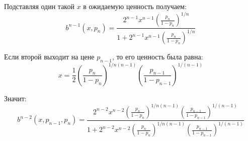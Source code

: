 \begin{enumerate}
Подставляя один такой $ x $ в ожидаемую ценность получаем:
\begin{equation}
b^{n-1}(x,p_{n})=\frac{2^{n-1}x^{n-1}\left(\frac{p_{n}}{1-p_{n}} \right)^{1/n}}{1+2^{n-1}x^{n-1}\left(\frac{p_{n}}{1-p_{n}} \right)^{1/n}}
\end{equation}

Если второй выходит на цене $ p_{n-1} $, то его ценность была равна:
\begin{equation}
x=\frac{1}{2}\left(\frac{p_{n}}{1-p_{n}} \right)^{1/n(n-1)}\left(\frac{p_{n-1}}{1-p_{n-1}} \right)^{1/(n-1)}
\end{equation}

Значит:
\begin{equation}
b^{n-2}(x,p_{n-1},p_{n})=\frac{2^{n-2}x^{n-2}\left(\frac{p_{n}}{1-p_{n}} \right)^{1/n(n-1)}\left(\frac{p_{n-1}}{1-p_{n-1}} \right)^{1/(n-1)}}{1+2^{n-2}x^{n-2}\left(\frac{p_{n}}{1-p_{n}} \right)^{1/n(n-1)}\left(\frac{p_{n-1}}{1-p_{n-1}} \right)^{1/(n-1)}}
\end{equation}





\end{enumerate}
